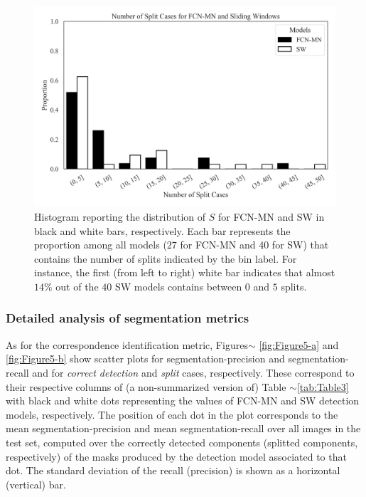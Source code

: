 \documentclass[a4paper,authoryear,review]{elsarticle}
\begin{document}
	
	\begin{figure}
		\centering
		\includegraphics[width=\textwidth]{figures/PPP_split_distribution.png}
		\caption{
			Histogram reporting the distribution of $S$ for FCN-MN and SW in black and white bars, respectively. Each bar represents the proportion among all models ($27$ for FCN-MN  and $40$ for SW) that contains the number of splits indicated by the bin label. For instance, the first (from left to right) white bar indicates that almost $14\%$ out of the $40$ SW models contains between $0$ and $5$ splits.
		}
		\label{fig:Figure4}
	\end{figure}
	
	
	\subsubsection{Detailed analysis of segmentation metrics}
	
	As for the correspondence identification metric, Figures$\sim$ \ref{fig:Figure5-a} and \ref{fig:Figure5-b} show scatter plots for segmentation-precision and segmentation-recall and for \emph{correct detection} and \emph{split} cases, respectively. These correspond to their respective columns of (a non-summarized version of) Table $\sim$\ref{tab:Table3} with black and white dots representing the values of FCN-MN and SW detection models, respectively. The position of each dot in the plot corresponds to the mean segmentation-precision and mean segmentation-recall over all images in the test set, computed over the correctly detected components (splitted components, respectively) of the masks produced by the detection model associated to that dot. The standard deviation of the recall (precision) is shown as a horizontal (vertical) bar.
	
\end{document}
